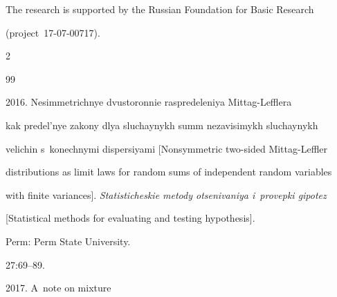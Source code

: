 \Ack


\noindent


The research is supported by the Russian Foundation for Basic Research 


(project~17-07-00717).













  \begin{multicols}{2}





\renewcommand{\bibname}{\protect\rmfamily References}







{\small\frenchspacing


 {%




 \begin{thebibliography}{99}






 2016. Nesimmetrichnye dvustoronnie raspredeleniya Mittag-Lefflera 


 kak predel'nye zakony dlya sluchaynykh summ nezavisimykh sluchaynykh 


 velichin s~konechnymi dispersiyami [Nonsymmetric two-sided Mittag-Leffler 


 distributions as limit laws for random sums of independent random variables 


 with finite variances]. \textit{Statisticheskie metody otsenivaniya i~provepki gipotez}


 [Statistical methods for evaluating and testing hypothesis].


 Perm: Perm State University. 


 27:69--89. %







 2017. A~note on mixture



\end{thebibliography}}}
\end{multicols}
